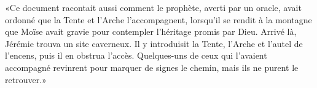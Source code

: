 «Ce document racontait aussi comment le prophète, averti par un oracle,
	avait ordonné que la Tente et l’Arche l’accompagnent,
	lorsqu’il se rendit à la montagne que Moïse avait gravie
		pour contempler l’héritage promis par Dieu.
Arrivé là, Jérémie trouva un site caverneux.
	Il y introduisit la Tente, l’Arche et l’autel de l’encens,
	puis il en obstrua l’accès.
Quelques-uns de ceux qui l’avaient accompagné revinrent pour marquer de signes le chemin,
	mais ils ne purent le retrouver.»
